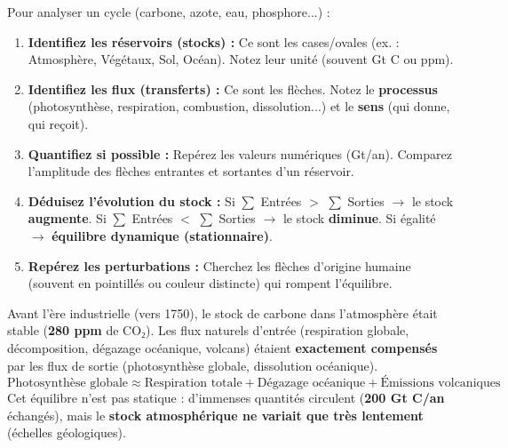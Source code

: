 \documentclass[11pt]{article}
\begin{document}
\begin{methode}
Pour analyser un cycle (carbone, azote, eau, phosphore...) :
\begin{enumerate}
    \item \textbf{Identifiez les réservoirs (stocks) :} Ce sont les cases/ovales (ex. : Atmosphère, Végétaux, Sol, Océan). Notez leur unité (souvent Gt C ou ppm).
    \item \textbf{Identifiez les flux (transferts) :} Ce sont les flèches. Notez le \textbf{processus} (photosynthèse, respiration, combustion, dissolution...) et le \textbf{sens} (qui donne, qui reçoit).
    \item \textbf{Quantifiez si possible :} Repérez les valeurs numériques (Gt/an). Comparez l'amplitude des flèches entrantes et sortantes d'un réservoir.
    \item \textbf{Déduisez l'évolution du stock :} Si $\sum$ Entrées $>$ $\sum$ Sorties $\rightarrow$ le stock \textbf{augmente}. Si $\sum$ Entrées $<$ $\sum$ Sorties $\rightarrow$ le stock \textbf{diminue}. Si égalité $\rightarrow$ \textbf{équilibre dynamique (stationnaire)}.
    \item \textbf{Repérez les perturbations :} Cherchez les flèches d'origine humaine (souvent en pointillés ou couleur distincte) qui rompent l'équilibre.
\end{enumerate}
\end{methode}

\begin{propriete}
Avant l'ère industrielle (vers 1750), le stock de carbone dans l'atmosphère était stable (\textbf{280 ppm} de CO₂). Les flux naturels d'entrée (respiration globale, décomposition, dégazage océanique, volcans) étaient \textbf{exactement compensés} par les flux de sortie (photosynthèse globale, dissolution océanique).
\[
\text{Photosynthèse globale} \approx \text{Respiration totale} + \text{Dégazage océanique} + \text{Émissions volcaniques}
\]
Cet équilibre n'est pas statique : d'immenses quantités circulent (\textbf{200 Gt C/an} échangés), mais le \textbf{stock atmosphérique ne variait que très lentement} (échelles géologiques).
\end{propriete}
\end{document}
